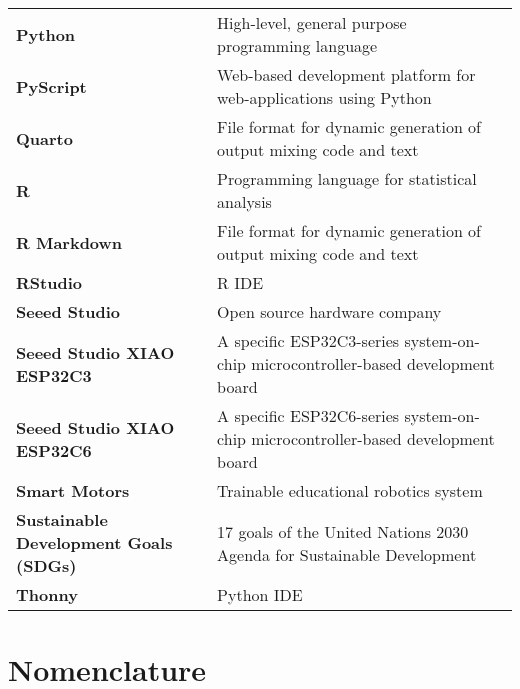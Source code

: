 {\begin{longtable}{>{\raggedright \bfseries}p{} p{}}
Python              & High-level, general purpose programming language \\
PyScript            & Web-based development platform for web-applications using Python \\
Quarto              & File format for dynamic generation of output mixing code and text \\
R                   & Programming language for statistical analysis \\
R Markdown          & File format for dynamic generation of output mixing code and text \\
RStudio             & R IDE\\
Seeed Studio        & Open source hardware company \\
Seeed Studio XIAO ESP32C3 & A specific ESP32C3-series system-on-chip microcontroller-based development board \\
Seeed Studio XIAO ESP32C6 & A specific ESP32C6-series system-on-chip microcontroller-based development board\\
Smart Motors        & Trainable educational robotics system \\
Sustainable Development Goals (SDGs) & 17 goals of the United Nations 2030 Agenda for Sustainable Development \\
Thonny              & Python IDE \\

\end{longtable}
}

\chapter*{Nomenclature}%
%
%
%

